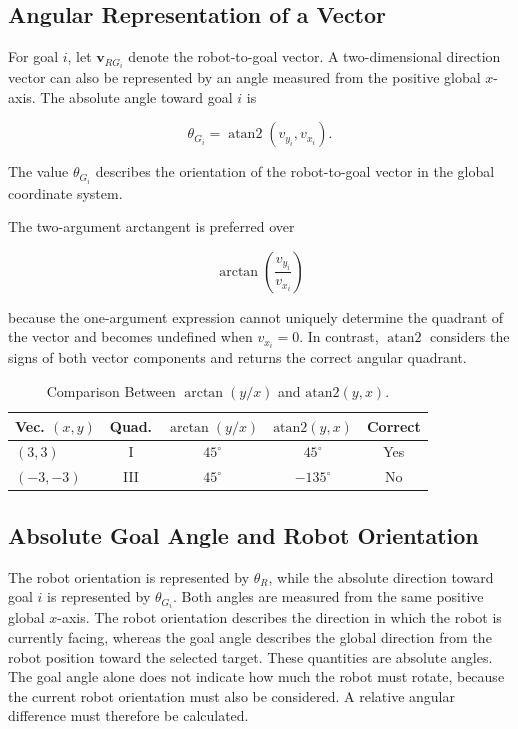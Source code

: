 \documentclass[10pt,twocolumn,a4paper]{article}
\begin{document}
\subsection{Angular Representation of a Vector}

For goal $i$, let $\mathbf{v}_{RG_i}$ denote the robot-to-goal vector. A two-dimensional direction vector can also be represented by an angle measured from the positive global $x$-axis. The absolute angle toward goal $i$ is

\begin{equation}
    \theta_{G_i} = \operatorname{atan2}(v_{y_i}, v_{x_i}).
    \label{eq:goal_angle}
\end{equation}

The value $\theta_{G_i}$ describes the orientation of the robot-to-goal vector in the global coordinate system.

The two-argument arctangent is preferred over

\begin{equation}
    \arctan\left(\frac{v_{y_i}}{v_{x_i}}\right)
\end{equation}

because the one-argument expression cannot uniquely determine the 
quadrant of the vector and becomes undefined when $v_{x_i}=0$. 
In contrast, $\operatorname{atan2}$ considers the signs of both 
vector components and returns the correct angular quadrant.


\begin{table}[htbp]
\centering
\caption{Comparison Between $\arctan(y/x)$ and $\text{atan2}(y, x)$.}
\label{tab:atan2_comparison}
\small %
\begin{tabular}{lcccc}
\toprule
\textbf{Vec.} $(x, y)$ & \textbf{Quad.} & $\arctan(y/x)$ & $\text{atan2}(y, x)$ & \textbf{Correct} \\
\midrule
$(3, 3)$   & I   & $45^{\circ}$ & $45^{\circ}$   & Yes \\
$(-3, -3)$ & III & $45^{\circ}$ & $-135^{\circ}$ & No \\
\bottomrule
\end{tabular}
\end{table}


\subsection{Absolute Goal Angle and Robot Orientation}

The robot orientation is represented by $\theta_R$, while 
the absolute direction toward goal $i$ is represented by $\theta_{G_i}$. 
Both angles are measured from the same positive global $x$-axis. 
The robot orientation describes the direction in which the robot is currently 
facing, whereas the goal angle describes the global direction from 
the robot position toward the selected target. These quantities 
are absolute angles. The goal angle alone does not indicate how much 
the robot must rotate, because the current robot orientation must also 
be considered. A relative angular difference must therefore be calculated.
\end{document}
